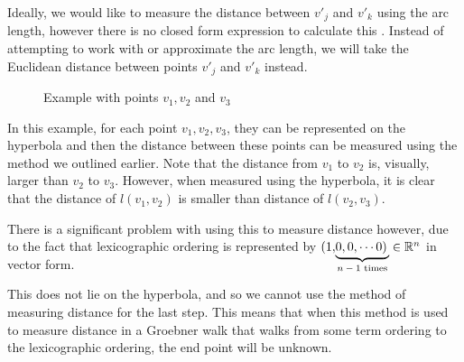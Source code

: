 \documentclass[12pt,a4paper]{report}
\begin{document}
Ideally, we would like to measure the distance between $v'_{j}$ and $v'_{k}$ using the arc length, however there is no closed form expression to calculate this . Instead of attempting to work with or approximate the arc length, we will take the Euclidean distance between points $v'_{j}$ and $v'_{k}$ instead.

\begin{figure}
\caption{Example with points $v_{1}, v_{2}$ and $v_{3}$}
\end{figure}

In this example, for each point $v_{1}, v_{2}, v_{3}$, they can be represented on the hyperbola and then the distance between these points can be measured using the method we outlined earlier. Note that the distance from $v_{1}$ to $v_{2}$ is, visually, larger than $v_{2}$ to $v_{3}$. However, when measured using the hyperbola, it is clear that the distance of $l(v_{1}, v_{2})$ is smaller than distance of $l(v_{2}, v_{3})$.

There is a significant problem with using this to measure distance however, due to the fact that lexicographic ordering is represented by $\smash[b]{(1,\! \underbrace{0, 0,\cdots 0)\,}_\text{$n-1$ times}} \in \mathbb R^{n}$ in vector form.


This does not lie on the hyperbola, and so we cannot use the method of measuring distance for the last step. This means that when this method is used to measure distance in a Groebner walk that walks from some term ordering to the lexicographic ordering, the end point will be unknown.
\end{document}
